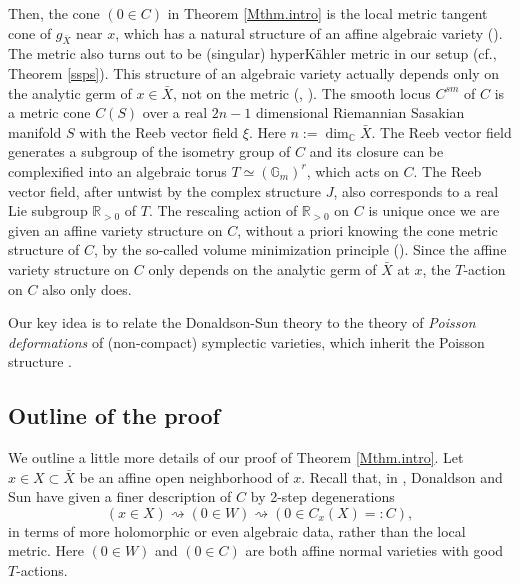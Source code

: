 \documentclass[12pt,a4paper]{amsart}
\theoremstyle{remark}
\theoremstyle{definition}
\def\dim{\operatorname{dim}}
\def\R{\mathbb{R}}
\begin{document}
Then, 
the cone $(0 \in C)$ in Theorem \ref{Mthm.intro} is the  
local metric tangent cone of $g_{\overline{X}}$ near $x$, which has a 
natural structure of an affine algebraic variety (\cite[1.3]{DSII}). 
The metric also turns out to be 
(singular) hyperK\"ahler metric in our setup 
(cf., Theorem \ref{ssps}). 
This structure of an algebraic variety actually depends only on the analytic germ of 
$x \in \bar{X}$, not on the metric 
(\cite[3.22]{DSII}, \cite{LWX}). 
The smooth locus $C^{sm}$ of $C$ is a metric cone $C(S)$ over a real 
$2n-1$ dimensional Riemannian Sasakian manifold $S$ with the 
Reeb vector field $\xi$. Here 
$n := \dim_{\mathbb C}\bar{X}$. 
The Reeb vector field generates a subgroup of the isometry group 
of $C$ and its closure can be complexified into an algebraic torus $T \simeq(\mathbb{G}_m)^r$, which acts on $C$. The Reeb vector field, after untwist by the complex structure $J$, 
also corresponds to a real Lie  subgroup $\mathbb{R}_{>0}$ of 
$T$. The rescaling action of 
$\R_{>0}$ on $C$ is unique once we are given an 
affine variety structure on $C$, without a priori knowing the cone metric structure of $C$, 
by the so-called volume 
minimization principle (\cite{MSY1, MSY2}). Since the affine variety structure on $C$ only depends  
on the analytic germ of $\bar{X}$ at $x$, the $T$-action on $C$ also only does.  


Our key idea is to relate the Donaldson-Sun theory 
to the theory of {\it Poisson deformations} of 
(non-compact) symplectic varieties, 
which inherit the Poisson structure \cite{Ginzburg-Kaledin, Nama, Namb}. 

\subsection{Outline of the proof}\label{sec:outline}
We outline a little more details of our proof of Theorem \ref{Mthm.intro}.  
Let $x \in X \subset \bar{X}$ be 
an affine open neighborhood of $x$. 
Recall that, in \cite[\S 3]{DSII}, Donaldson and Sun have given a finer description of $C$ by 2-step degenerations 
$$(x\in X)\rightsquigarrow (0\in W)\rightsquigarrow (0\in C_x(X)=:C),$$
in terms of more holomorphic or even algebraic data, 
rather than the local metric. 
Here $(0 \in W)$ and $(0 \in C)$ are both 
affine normal varieties with good $T$-actions. 
\end{document}
